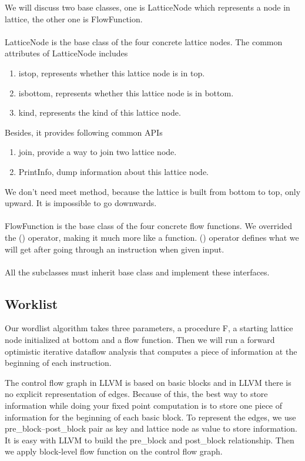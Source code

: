 \documentclass[paper=a4, fontsize=11pt]{scrartcl}
\numberwithin{equation}{section}		%
\numberwithin{figure}{section}			%
\numberwithin{table}{section}				%
\begin{document}
We will discuss two base classes, one is LatticeNode which represents a node in lattice, the other one is FlowFunction.\\ \\
LatticeNode is the base class of the four concrete lattice nodes. The common attributes of LatticeNode includes
\begin{enumerate}
\item istop, represents whether this lattice node is in top.
\item isbottom, represents whether this lattice node is in bottom.
\item kind, represents the kind of this lattice node.
\end{enumerate}
Besides, it provides following common APIs
\begin{enumerate}
\item join, provide a way to join two lattice node.
\item PrintInfo, dump information about this lattice node.
\end{enumerate}
We don't need meet method, because the lattice is built from bottom to top, only upward. It is impossible to go downwards. \\ \\
FlowFunction is the base class of the four concrete flow functions. We overrided the () operator, making it much more like a function. () operator defines what we will get after going through an instruction when given input. \\ \\
All the subclasses must inherit base class and implement these interfaces.

\subsection{Worklist}
Our wordlist algorithm takes three parameters, a procedure F, a starting lattice node initialized at bottom and a flow function. Then we will run a forward optimistic iterative dataflow analysis that computes a piece of information at the beginning of each instruction.

The control flow graph in LLVM is based on basic blocks and in LLVM there is no explicit representation of edges. Because of this, the best way to store information while doing your fixed point computation is to store one piece of information for the beginning of each basic block. To represent the edges, we use pre\_block--post\_block pair as key and lattice node as value to store information. It is easy with LLVM to build the pre\_block and post\_block relationship. Then we apply block-level flow function on the control flow graph.
\end{document}
